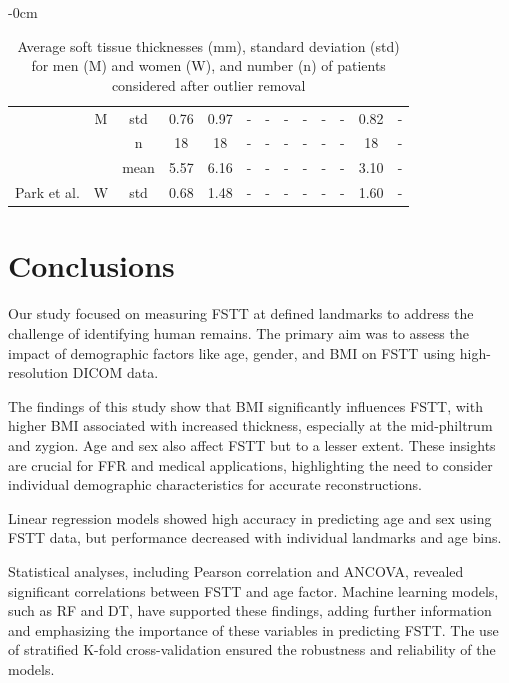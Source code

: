 \documentclass[journal,article,submit,pdftex,moreauthors]{Definitions/mdpi}
\begin{document}
\begin{table}[H]
\begin{adjustwidth}{-\extralength}{0cm}
{\begin{tabular}{ccccccccccccc}
 & \multirow{-3}{*}{M} & std & 0.76 & 0.97 & - & - & - & - & - & - & 0.82 & - \\ \cline{2-13} 
 &  & n & 18 & 18 & - & - & - & - & - & - & 18 & - \\ \cline{3-13} 
 &  & {\color[HTML]{FE0000} mean} & {\color[HTML]{FE0000} 5.57} & {\color[HTML]{FE0000} 6.16} & {\color[HTML]{FE0000} -} & {\color[HTML]{FE0000} -} & {\color[HTML]{FE0000} -} & {\color[HTML]{FE0000} -} & {\color[HTML]{FE0000} -} & {\color[HTML]{FE0000} -} & {\color[HTML]{FE0000} 3.10} & {\color[HTML]{FE0000} -} \\ \cline{3-13} 
\multirow{-6}{*}{Park et al.} & \multirow{-3}{*}{W} & std & 0.68 & 1.48 & - & - & - & - & - & - & 1.60 & - \\ \hline
\end{tabular}
}
\caption{Average soft tissue thicknesses (mm), standard deviation (std) for men (M) and women (W), and number (n) of patients considered after outlier removal \label{tab2}}
\end{adjustwidth}
\end{table}

\section{Conclusions}
\label{sec:conc}

Our study focused on measuring FSTT at defined landmarks to address the challenge of identifying human remains. The primary aim was to assess the impact of demographic factors like age, gender, and BMI on FSTT using high-resolution DICOM data.

The findings of this study show that BMI significantly influences FSTT, with higher BMI associated with increased thickness, especially at the mid-philtrum and zygion. Age and sex also affect FSTT but to a lesser extent. These insights are crucial for FFR and medical applications, highlighting the need to consider individual demographic characteristics for accurate reconstructions.

Linear regression models showed high accuracy in predicting age and sex using FSTT data, but performance decreased with individual landmarks and age bins. 

Statistical analyses, including Pearson correlation and ANCOVA, revealed significant correlations between FSTT and age factor. Machine learning models, such as RF and DT, have supported these findings, adding further information and emphasizing the importance of these variables in predicting FSTT. The use of stratified K-fold cross-validation ensured the robustness and reliability of the models.
\end{document}
